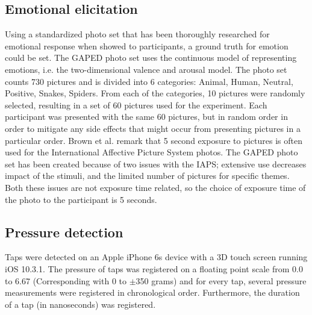 \documentclass{sigchi}
\begin{document}
\subsection{Emotional elicitation} %
\label{sub:emotional_elicitation}
Using a standardized photo set that has been thoroughly researched for emotional response when showed to participants, a ground truth for emotion could be set. The GAPED photo set uses the continuous model of representing emotions, i.e. the two-dimensional valence and arousal model. The photo set counts 730 pictures and is divided into 6 categories: Animal, Human, Neutral, Positive, Snakes, Spiders. From each of the categories, 10 pictures were randomly selected, resulting in a set of 60 pictures used for the experiment. Each participant was presented with the same 60 pictures, but in random order in order to mitigate any side effects that might occur from presenting pictures in a particular order. Brown et al. \cite{Neuroscience2012} remark that 5 second exposure to pictures is often used for the International Affective Picture System photos. The GAPED photo set has been created because of two issues with the IAPS; extensive use decreases impact of the stimuli, and the limited number of pictures for specific themes. Both these issues are not exposure time related, so the choice of exposure time of the photo to the participant is 5 seconds.


\subsection{Pressure detection} %
\label{sub:pressure_detection}
Taps were detected on an Apple iPhone 6s device with a 3D touch screen running iOS 10.3.1. The pressure of taps was registered on a floating point scale from 0.0 to 6.67 (Corresponding with 0 to $\pm$350 grams) and for every tap, several pressure measurements were registered in chronological order. Furthermore, the duration of a tap (in nanoseconds) was registered.
\end{document}
